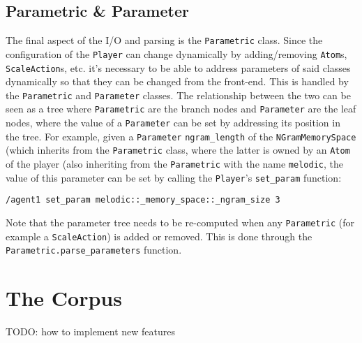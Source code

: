 
\subsection{Parametric \& Parameter}\label{ssec:2-parameters}
The final aspect of the I/O and parsing is the \texttt{Parametric} class. Since the configuration of the \texttt{Player} can change dynamically by adding/removing \texttt{Atom}s, \texttt{ScaleAction}s, etc. it's necessary to be able to address parameters of said classes dynamically so that they can be changed from the front-end. This is handled by the \texttt{Parametric} and \texttt{Parameter} classes. The relationship between the two can be seen as a tree where \texttt{Parametric} are the branch nodes and \texttt{Parameter} are the leaf nodes, where the value of a \texttt{Parameter} can be set by addressing its position in the tree. For example, given a \texttt{Parameter} \texttt{ngram\_length} of the \texttt{NGramMemorySpace} (which inherits from the \texttt{Parametric} class, where the latter is owned by an \texttt{Atom} of the player (also inheriting from the \texttt{Parametric} with the name \texttt{melodic}, the value of this parameter can be set by calling the \texttt{Player}'s \texttt{set\_param} function:
\begin{lstlisting}
/agent1 set_param melodic::_memory_space::_ngram_size 3
\end{lstlisting}
Note that the parameter tree needs to be re-computed when any \texttt{Parametric} (for example a \texttt{ScaleAction}) is added or removed. This is done through the \texttt{Parametric.parse\_parameters} function.



\section{The Corpus}\label{ssec:2-corpus}
TODO: how to implement new features


